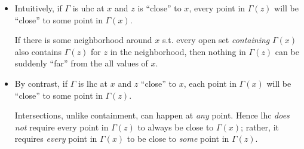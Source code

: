 \documentclass{article}
\theoremstyle{mythm}
\theoremstyle{mydef}
\begin{document}
\begin{itemize}
  \item Intuitively, if $\Gamma$ is uhc at $x$ and $z$ is ``close'' to $x$, every point in $\Gamma(z)$ will be ``close'' to some point in $\Gamma(x)$.

    If there is some neighborhood around $x$ s.t. every open set \textit{containing} $\Gamma(x)$ also contains $\Gamma(z)$ for $z$ in the neighborhood, then nothing in $\Gamma(z)$ can be suddenly ``far'' from the all values of $x$.

  \item By contrast, if $\Gamma$ is lhc at $x$ and $z$ ``close'' to $x$, each point in $\Gamma(x)$ will be ``close'' to some point in $\Gamma(z)$.

    Intersections, unlike containment, can happen at \textit{any} point. Hence lhc \textit{does not} require every point in $\Gamma(z)$ to always be close to $\Gamma(x)$; rather, it requires \textit{every} point in $\Gamma(x)$ to be close to \textit{some} point in $\Gamma(z)$.
\end{itemize}
\end{document}
